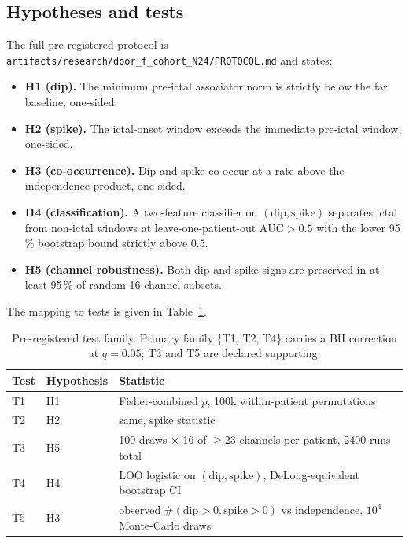 \documentclass[11pt,twocolumn]{article}
\begin{document}
\subsection{Hypotheses and tests}
The full pre-registered protocol is
\texttt{artifacts/research/door\_f\_cohort\_N24/PROTOCOL.md} and
states:
\begin{itemize}
\item \textbf{H1 (dip).} The minimum pre-ictal associator norm is
      strictly below the far baseline, one-sided.
\item \textbf{H2 (spike).} The ictal-onset window exceeds the
      immediate pre-ictal window, one-sided.
\item \textbf{H3 (co-occurrence).} Dip and spike co-occur at a rate
      above the independence product, one-sided.
\item \textbf{H4 (classification).} A two-feature classifier on
      $(\mathrm{dip},\mathrm{spike})$ separates ictal from non-ictal
      windows at leave-one-patient-out
      $\mathrm{AUC}>0.5$ with the lower 95\,\% bootstrap bound
      strictly above $0.5$.
\item \textbf{H5 (channel robustness).} Both dip and spike signs
      are preserved in at least 95\,\% of random 16-channel
      subsets.
\end{itemize}
The mapping to tests is given in Table~\ref{tab:tests}.

\begin{table}[t]
\centering\small
\begin{tabular}{@{}llp{3.4cm}@{}}
\toprule
Test & Hypothesis & Statistic \\
\midrule
T1 & H1 & Fisher-combined $p$, 100k within-patient permutations \\
T2 & H2 & same, spike statistic \\
T3 & H5 & 100 draws $\times$ 16-of-$\ge 23$ channels per patient,
            2400 runs total \\
T4 & H4 & LOO logistic on $(\mathrm{dip},\mathrm{spike})$,
            DeLong-equivalent bootstrap CI \\
T5 & H3 & observed $\#(\mathrm{dip}>0,\mathrm{spike}>0)$
            vs independence, $10^4$ Monte-Carlo draws \\
\bottomrule
\end{tabular}
\caption{Pre-registered test family. Primary family
         \{T1, T2, T4\} carries a BH correction at $q=0.05$;
         T3 and T5 are declared supporting.}
\label{tab:tests}
\end{table}
\end{document}
